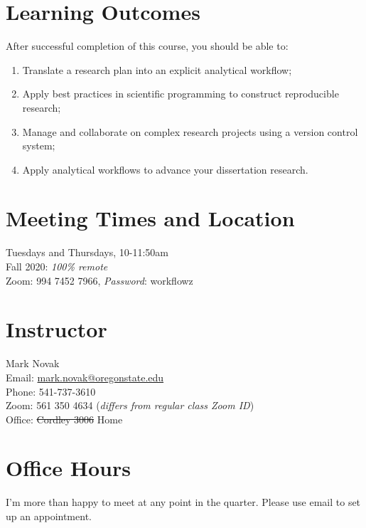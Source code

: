 \documentclass[10pt]{article}
\begin{document}
\section*{Learning Outcomes}
\noindent
After successful completion of this course, you should be able to:
\begin{enumerate}
	\itemsep0em
	\item Translate a research plan into an explicit analytical workflow;
	\item Apply best practices in scientific programming to construct reproducible research;
	\item Manage and collaborate on complex research projects using a version control system;
	\item Apply analytical workflows to advance your dissertation research.
\end{enumerate}

\section*{Meeting Times and Location}
\noindent
	Tuesdays and Thursdays, 10-11:50am\\
	Fall 2020: \emph{100\% remote}\\
	Zoom:  994 7452 7966, \emph{Password}: workflowz

\section*{Instructor}
\noindent
	Mark Novak\\
	Email: \href{mailto:mark.novak@oregonstate.edu}{mark.novak@oregonstate.edu}\\
	Phone: 541-737-3610\\
	Zoom:  561 350 4634 (\emph{differs from regular class Zoom ID})\\
	Office: \st{Cordley 3006} Home

\section*{Office Hours}
\noindent
	I'm more than happy to meet at any point in the quarter.
	Please use email to set up an appointment.
\end{document}
